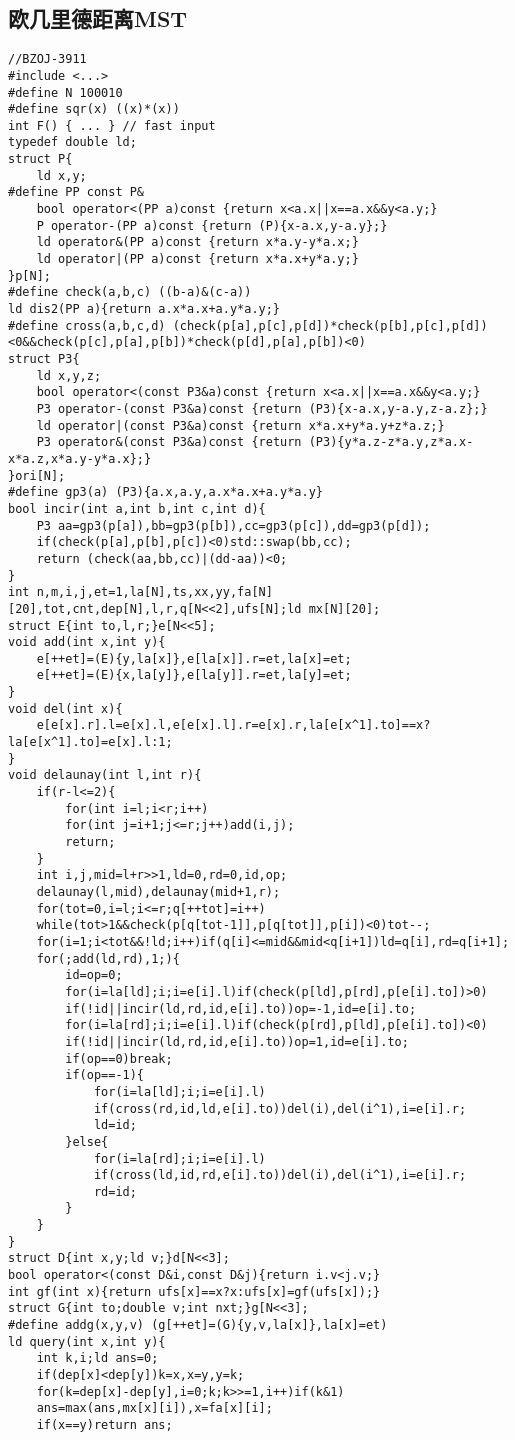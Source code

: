 \documentclass{article}
\begin{document}
\subsection{欧几里德距离MST}
\begin{lstlisting}
//BZOJ-3911
#include <...>
#define N 100010
#define sqr(x) ((x)*(x))
int F() { ... } // fast input 
typedef double ld;
struct P{
    ld x,y;
#define PP const P&
    bool operator<(PP a)const {return x<a.x||x==a.x&&y<a.y;}
    P operator-(PP a)const {return (P){x-a.x,y-a.y};}
    ld operator&(PP a)const {return x*a.y-y*a.x;}
    ld operator|(PP a)const {return x*a.x+y*a.y;}
}p[N];
#define check(a,b,c) ((b-a)&(c-a))
ld dis2(PP a){return a.x*a.x+a.y*a.y;}
#define cross(a,b,c,d) (check(p[a],p[c],p[d])*check(p[b],p[c],p[d])<0&&check(p[c],p[a],p[b])*check(p[d],p[a],p[b])<0)
struct P3{
    ld x,y,z;
    bool operator<(const P3&a)const {return x<a.x||x==a.x&&y<a.y;}
    P3 operator-(const P3&a)const {return (P3){x-a.x,y-a.y,z-a.z};}
    ld operator|(const P3&a)const {return x*a.x+y*a.y+z*a.z;}
    P3 operator&(const P3&a)const {return (P3){y*a.z-z*a.y,z*a.x-x*a.z,x*a.y-y*a.x};}
}ori[N];
#define gp3(a) (P3){a.x,a.y,a.x*a.x+a.y*a.y}
bool incir(int a,int b,int c,int d){
    P3 aa=gp3(p[a]),bb=gp3(p[b]),cc=gp3(p[c]),dd=gp3(p[d]);
    if(check(p[a],p[b],p[c])<0)std::swap(bb,cc);
    return (check(aa,bb,cc)|(dd-aa))<0;
}
int n,m,i,j,et=1,la[N],ts,xx,yy,fa[N][20],tot,cnt,dep[N],l,r,q[N<<2],ufs[N];ld mx[N][20];
struct E{int to,l,r;}e[N<<5];
void add(int x,int y){
    e[++et]=(E){y,la[x]},e[la[x]].r=et,la[x]=et;
    e[++et]=(E){x,la[y]},e[la[y]].r=et,la[y]=et;
}
void del(int x){
    e[e[x].r].l=e[x].l,e[e[x].l].r=e[x].r,la[e[x^1].to]==x?la[e[x^1].to]=e[x].l:1;
}
void delaunay(int l,int r){
    if(r-l<=2){
        for(int i=l;i<r;i++)
        for(int j=i+1;j<=r;j++)add(i,j);
        return;
    }
    int i,j,mid=l+r>>1,ld=0,rd=0,id,op;
    delaunay(l,mid),delaunay(mid+1,r);
    for(tot=0,i=l;i<=r;q[++tot]=i++)
    while(tot>1&&check(p[q[tot-1]],p[q[tot]],p[i])<0)tot--;
    for(i=1;i<tot&&!ld;i++)if(q[i]<=mid&&mid<q[i+1])ld=q[i],rd=q[i+1];
    for(;add(ld,rd),1;){
        id=op=0;
        for(i=la[ld];i;i=e[i].l)if(check(p[ld],p[rd],p[e[i].to])>0)
        if(!id||incir(ld,rd,id,e[i].to))op=-1,id=e[i].to;
        for(i=la[rd];i;i=e[i].l)if(check(p[rd],p[ld],p[e[i].to])<0)
        if(!id||incir(ld,rd,id,e[i].to))op=1,id=e[i].to;
        if(op==0)break;
        if(op==-1){
            for(i=la[ld];i;i=e[i].l)
            if(cross(rd,id,ld,e[i].to))del(i),del(i^1),i=e[i].r;
            ld=id;
        }else{
            for(i=la[rd];i;i=e[i].l)
            if(cross(ld,id,rd,e[i].to))del(i),del(i^1),i=e[i].r;
            rd=id;
        }
    }
}
struct D{int x,y;ld v;}d[N<<3];
bool operator<(const D&i,const D&j){return i.v<j.v;}
int gf(int x){return ufs[x]==x?x:ufs[x]=gf(ufs[x]);}
struct G{int to;double v;int nxt;}g[N<<3];
#define addg(x,y,v) (g[++et]=(G){y,v,la[x]},la[x]=et)
ld query(int x,int y){
    int k,i;ld ans=0;
    if(dep[x]<dep[y])k=x,x=y,y=k;
    for(k=dep[x]-dep[y],i=0;k;k>>=1,i++)if(k&1)
    ans=max(ans,mx[x][i]),x=fa[x][i];
    if(x==y)return ans;
     

\end{lstlisting}
\end{document}
